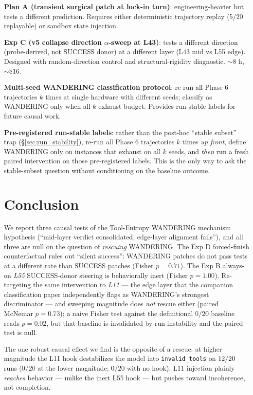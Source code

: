 \documentclass[11pt]{article}
\begin{document}
\textbf{Plan A (transient surgical patch at lock-in turn)}: engineering-heavier but tests a different prediction. Requires either deterministic trajectory replay (5/20 replayable) or sandbox state injection.

\textbf{Exp C (v5 collapse direction $\alpha$-sweep at L43)}: tests a different direction (probe-derived, not SUCCESS donor) at a different layer (L43 mid vs L55 edge). Designed with random-direction control and structural-rigidity diagnostic. $\sim$8 h, $\sim$\$16.

\textbf{Multi-seed WANDERING classification protocol}: re-run all Phase 6 trajectories $k$ times at single hardware with different seeds; classify as WANDERING only when all $k$ exhaust budget. Provides run-stable labels for future causal work.

\textbf{Pre-registered run-stable labels}: rather than the post-hoc ``stable subset'' trap (\S\ref{sec:run_stability}), re-run all Phase 6 trajectories $k$ times \emph{up front}, define WANDERING only on instances that exhaust on all $k$ seeds, and \emph{then} run a fresh paired intervention on those pre-registered labels. This is the only way to ask the stable-subset question without conditioning on the baseline outcome.

\section{Conclusion}

We report three causal tests of the Tool-Entropy WANDERING mechanism hypothesis (``mid-layer verdict consolidated, edge-layer alignment fails''), and all three are null on the question of \emph{rescuing} WANDERING. The Exp D forced-finish counterfactual rules out ``silent success'': WANDERING patches do not pass tests at a different rate than SUCCESS patches (Fisher $p=0.71$). The Exp B always-on \emph{L55} SUCCESS-donor steering is behaviorally inert (Fisher $p=1.00$). Re-targeting the same intervention to \emph{L11} --- the edge layer that the companion classification paper \cite{multichannel_2026} independently flags as WANDERING's strongest discriminator --- and sweeping magnitude does \emph{not} rescue either (paired McNemar $p=0.73$); a naive Fisher test against the definitional $0/20$ baseline reads $p=0.02$, but that baseline is invalidated by run-instability and the paired test is null.

The one robust causal effect we find is the opposite of a rescue: at higher magnitude the L11 hook destabilizes the model into \texttt{invalid\_tools} on $12/20$ runs ($0/20$ at the lower magnitude; $0/20$ with no hook). L11 injection plainly \emph{reaches} behavior --- unlike the inert L55 hook --- but pushes toward incoherence, not completion.
\end{document}
